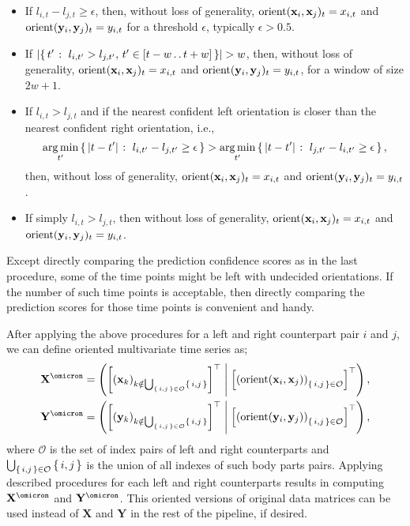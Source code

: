 \begin{itemize}
	\item If $l_{i,t} - l_{j,t} \geq  \epsilon$, then, without loss of generality, $\mathop{\rm{orient}}(\mathbf{x}_i, \mathbf{x}_j)_t=x_{i,t}$ and $\mathop{\rm{orient}}(\mathbf{y}_i, \mathbf{y}_j)_t=y_{i,t}$ for a threshold $\epsilon$, typically $\epsilon > 0.5$.

	\item If $\lvert\left\{ \, t^{\prime} \; \colon \; l_{i,t^{\prime}} > l_{j,t^{\prime}}, \, t^{\prime} \in [t-w \mathinner {\ldotp \ldotp} t+w] \, \right\}\rvert > w$, then, without loss of generality, $\mathop{\rm{orient}}(\mathbf{x}_i, \mathbf{x}_j)_t=x_{i,t}$ and $\mathop{\rm{orient}}(\mathbf{y}_i, \mathbf{y}_j)_t=y_{i,t}$, for a window of size $2w+1$.

	\item If $l_{i,t} > l_{j,t}$ and if the nearest confident left orientation is closer than the nearest confident right orientation, i.e., $$\operatorname*{arg\,min}_{t^{\prime}} \left\{ \, \abs{t-t^{\prime}} \; \colon \; l_{i,t^{\prime}} - l_{j,t^{\prime}} \geq \epsilon \, \right\} > \operatorname*{arg\,min}_{t^{\prime}} \left\{ \, \abs{t - t^{\prime}} \; \colon \; l_{j,t^{\prime}} - l_{i,t^{\prime}} \geq \epsilon \, \right\},$$ then, without loss of generality, $\mathop{\rm{orient}}(\mathbf{x}_i, \mathbf{x}_j)_t=x_{i,t}$ and $\mathop{\rm{orient}}(\mathbf{y}_i, \mathbf{y}_j)_t=y_{i,t}$.
	\item If simply $l_{i,t} > l_{j,t}$, then without loss of generality, $\mathop{\rm{orient}}(\mathbf{x}_i, \mathbf{x}_j)_t=x_{i,t}$ and $\mathop{\rm{orient}}(\mathbf{y}_i, \mathbf{y}_j)_t=y_{i,t}$.
\end{itemize}

Except directly comparing the prediction confidence scores as in the last procedure, some of the time points might be left with undecided orientations.
If the number of such time points is acceptable, then directly comparing the prediction scores for those time points is convenient and handy.

After applying the above procedures for a left and right counterpart pair $i$ and $j$, we can define oriented multivariate time series as;
\begin{align*}
	\mathbf{X}^{\omicron} & = \rbrkt{\sqbrkt{\rbrkt{\mathbf{x}_k}_{k \notin \bigcup_{\set{i,j} \in \mathcal{O}} \set{i,j}}}^\top \concat \sqbrkt{\rbrkt{\orient{\mathbf{x}_i, \mathbf{x}_j}}_{\set{i,j} \in \mathcal{O}}}^\top}, \\
	\mathbf{Y}^{\omicron} & = \rbrkt{\sqbrkt{\rbrkt{\mathbf{y}_k}_{k \notin \bigcup_{\set{i,j} \in \mathcal{O}} \set{i,j}}}^\top \concat \sqbrkt{\rbrkt{\orient{\mathbf{y}_i, \mathbf{y}_j}}_{\set{i,j} \in \mathcal{O}}}^\top},
\end{align*}
where $\mathcal{O}$ is the set of index pairs of left and right counterparts and $\bigcup_{\left\{ \, i,j \, \right\} \in \mathcal{O}} \left\{ \, i,j \, \right\}$ is the union of all indexes of such body parts pairs.
Applying described procedures for each left and right counterparts results in computing $\mathbf{X}^{\omicron}$ and $\mathbf{Y}^{\omicron}$.
This oriented versions of original data matrices can be used instead of $\mathbf{X}$ and $\mathbf{Y}$ in the rest of the pipeline, if desired.

